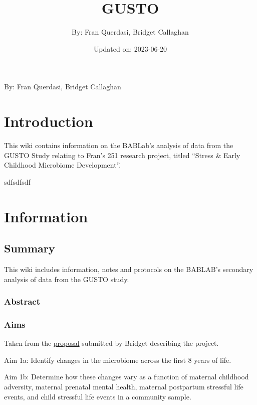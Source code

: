 \documentclass[
]{book}
\title{GUSTO}
\author{By: Fran Querdasi, Bridget Callaghan}
\date{Updated on: 2023-06-20}
\begin{document}
\maketitle

{
\setcounter{tocdepth}{1}
\tableofcontents
}
By: Fran Querdasi, Bridget Callaghan

\hypertarget{introduction}{%
\chapter{Introduction}\label{introduction}}

This wiki contains information on the BABLab's analysis of data from the GUSTO Study relating to Fran's 251 research project, titled ``Stress \& Early Childhood Microbiome Development''.

sdfsdfsdf

\hypertarget{information}{%
\chapter{Information}\label{information}}

\hypertarget{summary}{%
\section{Summary}\label{summary}}

This wiki includes information, notes and protocols on the BABLAB's secondary analysis of data from the GUSTO study.

\hypertarget{abstract}{%
\subsection{Abstract}\label{abstract}}

\hypertarget{aims}{%
\subsection{Aims}\label{aims}}

Taken from the \href{https://ucla.app.box.com/file/740587024475}{proposal} submitted by Bridget describing the project.

Aim 1a: Identify changes in the microbiome across the first 8 years of life.

Aim 1b: Determine how these changes vary as a function of maternal childhood adversity, maternal prenatal mental health, maternal postpartum stressful life events, and child stressful life events in a community sample.
\end{document}
